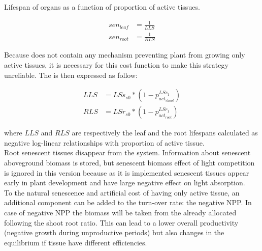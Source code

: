\begin{marginfigure}
\label{fig:lifespan}
\caption{Lifespan of organs as a function of proportion of active tissues.}
\end{marginfigure}

\begin{align}
sen_{leaf} &= \frac{1}{LLS}\\
sen_{root} &= \frac{1}{RLS}
\end{align}

Because \model does not contain any mechanism preventing plant from growing only  active tissues, it is necessary for this cost function to make this strategy unreliable. The is then expressed as follow:

\begin{align}
LLS &= LSs_{s0} * (1- p_{act_{shoot}}^{LSs_{1}}) \\
RLS &= LSr_{s0} * (1- p_{act_{root}}^{LSr_{1}})
\end{align}


where $LLS$ and $RLS$ are respectively the leaf and the root lifespans calculated as negative log-linear relationships with proportion of active tissue.\\
\indent Root senescent tissues disappear from the system. Information about senescent aboveground biomass is stored, but senescent biomass effect of light competition is ignored in this version because as it is implemented senescent tissues appear early in plant development and have large negative effect on light absorption.\\
\indent To the natural senescence and artificial cost of having only active tissue, an additional component can be added to the turn-over rate: the negative NPP. In case of negative NPP the biomass will be taken from the already allocated following the shoot root ratio. This can lead to a lower overall productivity (negative growth during unproductive periods) but also changes in the equilibrium if tissue have different efficiencies.\\

